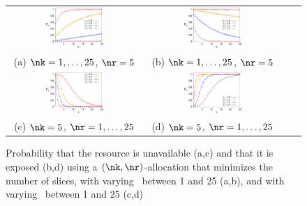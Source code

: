 \begin{figure}[t]
	\centering
	\hspace*{-25pt}
	\setlength{\tabcolsep}{20pt}
	\begin{tabular}{cccc}
	    \includegraphics[width=0.45\textwidth]{figures/bdfprs-fig06a} &
	    \includegraphics[width=0.45\textwidth]{figures/bdfprs-fig06b} \\[3pt]
	    \footnotesize{\hspace{20pt}(a) $\nk=1,\ldots,25$, $\nr=5$} &
	    \footnotesize{\hspace{20pt}(b) $\nk=1,\ldots,25$, $\nr=5$} \\[20pt]
	    \includegraphics[width=0.45\textwidth]{figures/bdfprs-fig06c} &
	    \includegraphics[width=0.45\textwidth]{figures/bdfprs-fig06d} \\[3pt]
	    \footnotesize{\hspace{20pt}(c) $\nk=5$, $\nr=1,\ldots,25$} & 
	    \footnotesize{\hspace{20pt}(d) $\nk=5$, $\nr=1,\ldots,25$} \\[20pt]
	\end{tabular}
    \caption{\label{dcs:fig:diagonal} Probability that the resource is unavailable (a,c) and that it is exposed (b,d) using a $(\nk,\nr)$-allocation that minimizes the number of slices, with  varying \nk\ between 1 and 25 (a,b), and with  varying \nr\ between 1 and 25 (c,d)}
\end{figure}

